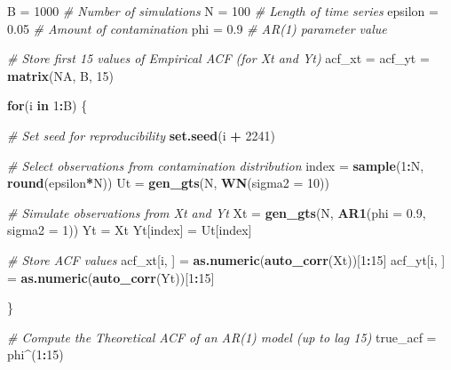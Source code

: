 \documentclass[]{book}
\newenvironment{Shaded}{\begin{snugshade}}{\end{snugshade}}
\newcommand{\CommentTok}[1]{\textcolor[rgb]{0.56,0.35,0.01}{\textit{#1}}}
\newcommand{\ControlFlowTok}[1]{\textcolor[rgb]{0.13,0.29,0.53}{\textbf{#1}}}
\newcommand{\DataTypeTok}[1]{\textcolor[rgb]{0.13,0.29,0.53}{#1}}
\newcommand{\DecValTok}[1]{\textcolor[rgb]{0.00,0.00,0.81}{#1}}
\newcommand{\FloatTok}[1]{\textcolor[rgb]{0.00,0.00,0.81}{#1}}
\newcommand{\KeywordTok}[1]{\textcolor[rgb]{0.13,0.29,0.53}{\textbf{#1}}}
\newcommand{\NormalTok}[1]{#1}
\newcommand{\OperatorTok}[1]{\textcolor[rgb]{0.81,0.36,0.00}{\textbf{#1}}}
\newcommand{\OtherTok}[1]{\textcolor[rgb]{0.56,0.35,0.01}{#1}}
\newcommand{\StringTok}[1]{\textcolor[rgb]{0.31,0.60,0.02}{#1}}
\theoremstyle{definition}
\theoremstyle{definition}
\theoremstyle{definition}
\theoremstyle{remark}
\begin{document}
\begin{Shaded}
\begin{Highlighting}[]
\NormalTok{B =}\StringTok{ }\DecValTok{1000} \CommentTok{# Number of simulations}
\NormalTok{N =}\StringTok{ }\DecValTok{100} \CommentTok{# Length of time series}
\NormalTok{epsilon =}\StringTok{ }\FloatTok{0.05} \CommentTok{# Amount of contamination}
\NormalTok{phi =}\StringTok{ }\FloatTok{0.9} \CommentTok{# AR(1) parameter value}

\CommentTok{# Store first 15 values of Empirical ACF (for Xt and Yt)}
\NormalTok{acf_xt =}\StringTok{ }\NormalTok{acf_yt =}\StringTok{ }\KeywordTok{matrix}\NormalTok{(}\OtherTok{NA}\NormalTok{, B, }\DecValTok{15}\NormalTok{)}

\ControlFlowTok{for}\NormalTok{(i }\ControlFlowTok{in} \DecValTok{1}\OperatorTok{:}\NormalTok{B) \{}
  
  \CommentTok{# Set seed for reproducibility}
  \KeywordTok{set.seed}\NormalTok{(i }\OperatorTok{+}\StringTok{ }\DecValTok{2241}\NormalTok{)}

  \CommentTok{# Select observations from contamination distribution}
\NormalTok{  index =}\StringTok{ }\KeywordTok{sample}\NormalTok{(}\DecValTok{1}\OperatorTok{:}\NormalTok{N, }\KeywordTok{round}\NormalTok{(epsilon}\OperatorTok{*}\NormalTok{N))}
\NormalTok{  Ut =}\StringTok{ }\KeywordTok{gen_gts}\NormalTok{(N, }\KeywordTok{WN}\NormalTok{(}\DataTypeTok{sigma2 =} \DecValTok{10}\NormalTok{))}

  \CommentTok{# Simulate observations from Xt and Yt}
\NormalTok{  Xt =}\StringTok{ }\KeywordTok{gen_gts}\NormalTok{(N, }\KeywordTok{AR1}\NormalTok{(}\DataTypeTok{phi =} \FloatTok{0.9}\NormalTok{, }\DataTypeTok{sigma2 =} \DecValTok{1}\NormalTok{))}
\NormalTok{  Yt =}\StringTok{ }\NormalTok{Xt}
\NormalTok{  Yt[index] =}\StringTok{ }\NormalTok{Ut[index]}
  
  \CommentTok{# Store ACF values}
\NormalTok{  acf_xt[i, ] =}\StringTok{ }\KeywordTok{as.numeric}\NormalTok{(}\KeywordTok{auto_corr}\NormalTok{(Xt))[}\DecValTok{1}\OperatorTok{:}\DecValTok{15}\NormalTok{]}
\NormalTok{  acf_yt[i, ] =}\StringTok{ }\KeywordTok{as.numeric}\NormalTok{(}\KeywordTok{auto_corr}\NormalTok{(Yt))[}\DecValTok{1}\OperatorTok{:}\DecValTok{15}\NormalTok{]}
  
\NormalTok{\}}

\CommentTok{# Compute the Theoretical ACF of an AR(1) model (up to lag 15)}
\NormalTok{true_acf =}\StringTok{ }\NormalTok{phi}\OperatorTok{^}\NormalTok{(}\DecValTok{1}\OperatorTok{:}\DecValTok{15}\NormalTok{)}


\end{Highlighting}
\end{Shaded}
\end{document}
